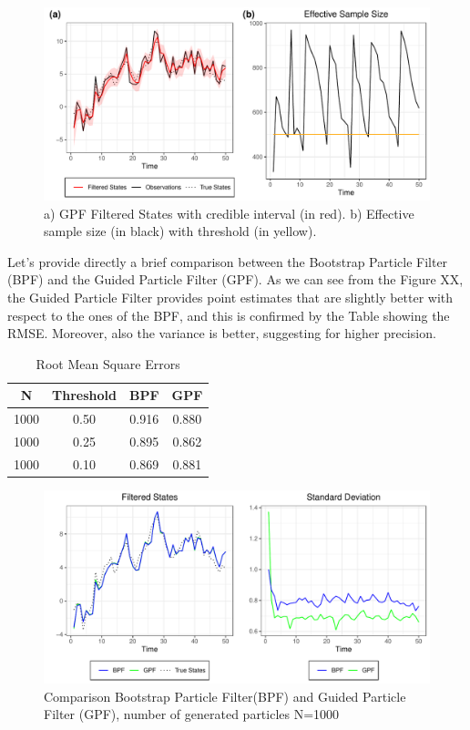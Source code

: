 \documentclass[
]{book}
\theoremstyle{break}
\theoremstyle{nonumberplain}
\begin{document}
\begin{figure}[H]

{\centering \includegraphics{final-draft_files/figure-latex/unnamed-chunk-20-1} 

}

\caption{a) GPF Filtered States with credible interval (in red). b) Effective sample size (in black) with threshold (in yellow).}\label{fig:unnamed-chunk-20}
\end{figure}

Let's provide directly a brief comparison between the Bootstrap Particle
Filter (BPF) and the Guided Particle Filter (GPF). As we can see from
the Figure XX, the Guided Particle Filter provides point estimates that
are slightly better with respect to the ones of the BPF, and this is
confirmed by the Table showing the RMSE. Moreover, also the variance is
better, suggesting for higher precision.

\begin{longtable}[t]{cccc}
\caption{\label{tab:unnamed-chunk-22}Root Mean Square Errors}\\
\toprule
N & Threshold & BPF & GPF\\
\midrule
1000 & 0.50 & 0.916 & 0.880\\
1000 & 0.25 & 0.895 & 0.862\\
1000 & 0.10 & 0.869 & 0.881\\
\bottomrule
\end{longtable}

\begin{figure}[H]

{\centering \includegraphics{final-draft_files/figure-latex/unnamed-chunk-23-1} 

}

\caption{Comparison Bootstrap Particle Filter(BPF) and Guided Particle Filter (GPF), number of generated particles N=1000}\label{fig:unnamed-chunk-23}
\end{figure}
\end{document}
